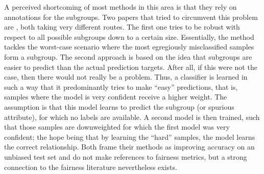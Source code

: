 A perceived shortcoming of most methods in this area is that they rely on annotations for the subgroups.
Two papers that tried to circumvent this problem are \citet{HasSriNamLia18,nam2020learning},
both taking very different routes.
The first one tries to be robust with respect to all possible subgroups down to a certain size.
Essentially, the method tackles the worst-case scenario where the most egregiously misclassified samples form a subgroup.
The second approach is based on the idea that subgroups are easier to predict than the actual prediction targets.
After all, if this were not the case, then there would not really be a problem.
Thus, a classifier is learned in such a way that it predominantly tries to make ``easy'' predictions,
that is, samples where the model is very confident receive a higher weight.
The assumption is that this model learns to predict the subgroup (or spurious attribute),
for which no labels are available.
A second model is then trained, such that those samples are downweighted for which the first model was very confident;
the hope being that by learning the ``hard'' samples, the model learns the correct relationship.
Both \citet{HasSriNamLia18,nam2020learning} frame their methods as improving accuracy on an unbiased test set
and do not make references to fairness metrics,
but a strong connection to the fairness literature nevertheless exists.




